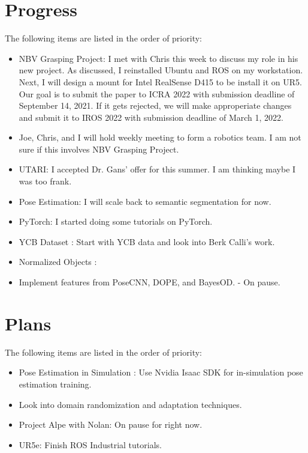 \documentclass[11pt]{article}
\begin{document}
\section{Progress}
The following items are listed in the order of priority:
\begin{itemize}
      \item NBV Grasping Project: I met with Chris this week to discuss my role
      in his new project. As discussed, I reinstalled Ubuntu and ROS on my
      workstation. Next, I will design a mount for Intel RealSense D415 to be
      install it on UR5. Our goal is to submit the paper to ICRA 2022 with
      submission deadline of September 14, 2021. If it gets rejected, we will
      make approperiate changes and submit it to IROS 2022 with submission
      deadline of March 1, 2022.

      \item Joe, Chris, and I will hold weekly meeting to form a robotics team.
      I am not sure if this involves NBV Grasping Project.

      \item UTARI: I accepted Dr. Gans' offer for this summer. I am thinking
      maybe I was too frank.

      \item Pose Estimation: I will scale back to semantic segmentation for now.

      \item PyTorch: I started doing some tutorials on PyTorch.

      \item YCB Dataset \cite{calli2015ycb}: Start with YCB data and look into
      Berk Calli's work.
      \item Normalized Objects \cite{Wang_2019_CVPR}:
      \item Implement features from PoseCNN, DOPE, and BayesOD. - On pause.
\end{itemize}


\section{Plans}
The following items are listed in the order of priority:

\begin{itemize}
      \item Pose Estimation in Simulation \cite{NVIDIAIs75:online}: Use Nvidia
      Isaac SDK for in-simulation pose estimation training.
      \item Look into domain randomization and adaptation techniques.
      \item Project Alpe with Nolan: On pause for right now.
      \item UR5e: Finish ROS Industrial tutorials.
\end{itemize}
\end{document}
